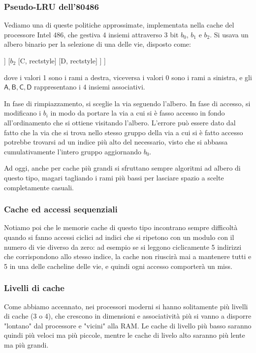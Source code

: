 \documentclass[a4paper,11pt]{article}
\begin{document}
\newpage

\subsubsection{Pseudo-LRU dell'80486}
Vediamo una di queste politiche approssimate, implementata nella cache del processore Intel 486, che gestiva 4 insiemi attraverso 3 bit $b_0$, $b_1$ e $b_2$.
Si usava un albero binario per la selezione di una delle vie, disposto come:
\begin{center}
	\begin{forest}
		[$b_0$, roundstyle
			[$b_1$
				[A, rectstyle]
				[B, rectstyle]
				]
			[$b_2$
				[C, rectstyle]
				[D, rectstyle]
			]
		]	
	\end{forest}
\end{center}
dove i valori 1 sono i rami a destra, viceversa i valori 0 sono i rami a sinistra, e gli $\mathsf{A, B, C, D}$ rappresentano i 4 insiemi associativi.

In fase di rimpiazzamento, si sceglie la via seguendo l'albero.
In fase di accesso, si modificano i $b_i$ in modo da portare la via a cui si è fasso accesso in fondo all'ordinamento che si ottiene visitando l'albero.
L'errore può essere dato dal fatto che la via che si trova nello stesso gruppo della via a cui si è fatto accesso potrebbe trovarsi ad un indice più alto del necessario, visto che si abbassa cumulativamente l'intero gruppo aggiornando $b_0$.

\par\smallskip

Ad oggi, anche per cache più grandi si sfruttano sempre algoritmi ad albero di questo tipo, magari tagliando i rami più bassi per lasciare spazio a scelte completamente casuali.

\subsubsection{Cache ed accessi sequenziali}
Notiamo poi che le memorie cache di questo tipo incontrano sempre difficoltà quando si fanno accessi ciclici ad indici che si ripetono con un modulo con il numero di vie diverso da zero: ad esempio se si leggono ciclicamente 5 indirizzi che corrispondono allo stesso indice, la cache non riuscirà mai a mantenere tutti e 5 in una delle cacheline delle vie, e quindi ogni accesso comporterà un miss.

\subsubsection{Livelli di cache}
Come abbiamo accennato, nei processori moderni si hanno solitamente più livelli di cache (3 o 4), che crescono in dimensioni e associatività più si vanno a disporre "lontano" dal processore e "vicini" alla RAM.
Le cache di livello più basso saranno quindi più veloci ma più piccole, mentre le cache di livelo alto saranno più lente ma più grandi.
\end{document}
